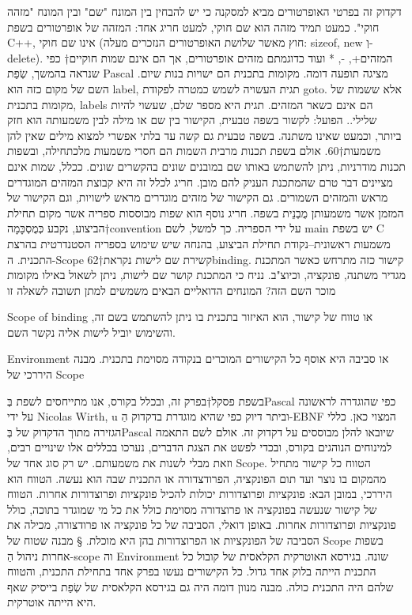       דקדוק זה בפרטי האופרטורים מביא למסקנה כי יש להבחין בין המונח "שם" ובין המונח "מזהה חוקי". כמעט תמיד מזהה הוא שם חוקי, למעט חריג אחד: המזהה של אופרטורים בשפת C++, אינו שם חוקי (חוץ מאשר שלושת האופרטורים הנזכרים מעלה: sizeof, new וְ- delete). המזהים+, -, * ועוד כדוגמתם מזהים אופרטורים, אך הם אינם שמות חוקיים†{ כפי שנראה בהמשך, שְׂפַת Pascal מציגה תופעה דומה. מקומות בתכנית הם ישויות בנות שיום. השם של מקום כזה הוא label, תגית העשויה לשמש כמטרה לפקודת goto. אלא ששמות של מקומות בתכנית, labels הם אינם כשאר המזהים. תגית היא מספר שלם, שעשוי להיות שלילי.}.
      הפועל: לקשור
      בשפה טבעית, הקישור בין שם או מילה לבין משמעותה הוא חזק ביותר, וכמעט שאינו משתנה. בשפה טבעית גם קשה עד בלתי אפשרי למצוא מילים שאין להן משמעות†{60}. אולם בשפת תכנות מרבית השמות הם חסרי משמעות מלכתחילה, ובשפות תכנות מודרניות, ניתן להשתמש באותו שם במובנים שונים בהקשרים שונים.
      ככלל, שמות אינם מציינים דבר טרם שהמתכנת העניק להם מובן. חריג לכלל זה היא קבוצת המזהים המוגדרים מראש והמזהים השמורים. גם הקישור של מזהים מוגדרים מראש לישויות, וגם הקישור של המזמן אשר משמעותן מֻבְנֵית בשפה. חריג נוסף הוא שפות מבוססות ספריה אשר מקום תחילת הביצוע, נקבע כְּמֻסְכָּמָה†{convention} על ידי הספריה. כך למשל, לשם main יש בשפת C משמעות ראשונית--נקודת תחילת הביצוע, בהנחה שיש שימוש בספריה הסטנדרטית בהרצת התכנית.
      ה-Scope
      קשירת שם לישות נקראת†{62}binding. קישור כזה מתרחש כאשר המתכנת מגדיר משתנה, פונקציה, וכיוצ"ב. נניח כי המתכנת קושר שם לישות, ניתן לשאול באילו מקומות מוכר השם הזה? המונחים הדואליים הבאים משמשים למתן תשובה לשאלה זו
\begin{ציינון}
\item Scope of binding או טווח של קישור, הוא האיזור בתכנית בו ניתן להשתמש בשם זה, והשימוש יוביל לישות אליה נקשר השם.
\item Environment או סביבה היא אוסף כל הקישורים המוכרים בנקודה מסוימת בתכנית.
      מבנה היררכי של Scope
  \end{ציינון}
      בשפת פסקל†{בפרק זה, ובכלל בקורס, אנו מתייחסים לשפת בְּPascal כפי שהוגדרה לראשונה על ידי Nicolas Wirth, u וביתר דיוק כפי שהיא מוגדרת בדקדוק הַ-EBNF המצוי כאן. כללי הגזירה מתוך הדקדוק של בְּPascal שיובאו להלן מבוססים על דקדוק זה. אולם לשם התאמה למינוחים הנוהגים בקורס, ובכדי לפשט את הצגת הדברים, נערכו בכללים אלו שינויים רבים, וזאת מבלי לשנות את משמעותם.} יש רק סוג אחד של Scope. הטווח כל קישור מתחיל מהמקום בו נוצר ועד תום הפונקציה, הפרודצדורה או התכנית שבה הוא נעשה. הטווח הוא היררכי, במובן הבא: פונקציות ופרוצדורות יכולות להכיל פונקציות ופרוצדורות אחרות. הטווח של קישור שנעשה בפונקציה או פרוצדורה מסוימת כולל את כל מי שמוגדר בתוכה, כולל פונקציות ופרוצדורות אחרות. באופן דואלי, הסביבה של כל פונקציה או פרודצורה, מכילה את הסביבה של הפונקציות או הפרוצדורות בהן היא מוכלת.
      § מבנה שטוח של Scope
      בשפות אחרות ניהול הַ-scope וה Environment שונה. בגירסא האוטרקית הקלאסית של קובול כל התכנית הייתה בלוק אחד גדול. כל הקישורים נעשו בפרק אחד בתחילת התכנית, והטווח שלהם היה התכנית כולה. מבנה מנוון דומה היה גם בגירסא הקלאסית של שְׂפַת בייסיק שאף היא הייתה אוטרקית.

